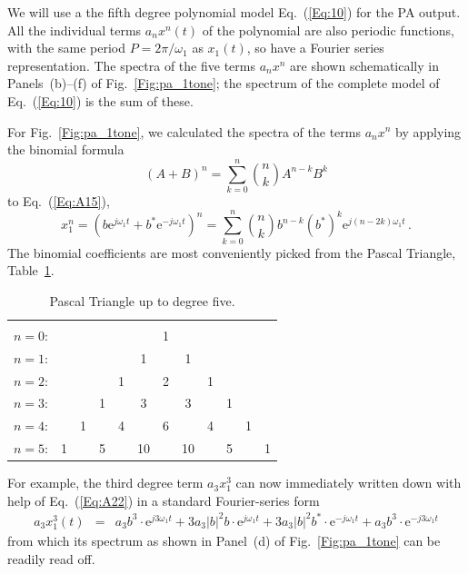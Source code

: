 \documentclass[11pt,oneside,a4paper]{scrartcl}
\newcommand{\EQ}[1]{\begin{equation}\label{Eq:#1}}
\newcommand{\EE}{\end{equation}}
\newcommand{\Eq}[1]{Eq.~(\ref{Eq:#1})}
\newcommand{\Fig}[1]{Fig.~\ref{Fig:#1}}
\newcommand{\Abs}[1]{\ensuremath{\left|#1\right|}}
\newcommand{\cc}[1]{\ensuremath{{#1}^*}}
\newcommand{ \Exp }[1] {\ensuremath {\mathrm e ^ {#1}}}
\begin{document}
We will use a the fifth degree polynomial model \Eq{10} for the PA output. All the individual terms $a_n x^n(t)$ of the polynomial are also periodic functions, with the same period $P = 2\pi/\omega_1$ as $x_1(t)$,  so have a Fourier series representation. The spectra of the five terms $a_n x^n$ are shown schematically in Panels~(b)--(f) of \Fig{pa_1tone}; the spectrum of the complete model of \Eq{10} is the sum of these.  

For \Fig{pa_1tone}, we calculated the spectra of the terms $a_n x^n$ by applying the binomial formula
\[
	(A+B)^n = \sum_{k=0}^n \binom{n}{k} A^{n-k}B^k 
\]
to \Eq{A15},
\EQ{A22}
	x_1^n
	=
	\left(b \Exp{j \omega_1 t} + \cc b \Exp{-j\omega_1 t}\right)^n
	= 
	\sum_{k=0}^n \binom{n}{k} b^{n-k}({\cc b})^k \Exp{j (n - 2k)\omega_1 t} \,.
\EE
The binomial coefficients are most conveniently picked from the Pascal Triangle, Table~\ref{pascal_triangle}. 
\begin{table}[t]
\caption{Pascal Triangle up to degree five.}
\begin{center}
\footnotesize
\begin{tabular}{rccccccccccc}\hline\\
$n=0$:&    &    &    &    &    &  1\\\noalign{\smallskip\smallskip}
$n=1$:&    &    &    &    &  1 &    &  1\\\noalign{\smallskip\smallskip}
$n=2$:&    &    &    &  1 &    &  2 &    &  1\\\noalign{\smallskip\smallskip}
$n=3$:&    &    &  1 &    &  3 &    &  3 &    &  1\\\noalign{\smallskip\smallskip}
$n=4$:&    &  1 &    &  4 &    &  6 &    &  4 &    &  1\\\noalign{\smallskip\smallskip}
$n=5$:&  1 &    &  5 &    & 10 &    & 10 &    &  5 &    &  1\\
\end{tabular}
\normalsize
\end{center}
\label{pascal_triangle}
\end{table}
%
For example, the third degree term $a_3x_1^3$ can now immediately written down with help of \Eq{A22} in a standard Fourier-series form
\begin{eqnarray}
	a_3x_1^3(t) &=&	a_3b^3 \cdot \Exp{j3\omega_1 t}
					+ 3a_3 {\Abs b}^2 {b} \cdot \Exp{j\omega_1 t}
					+ 3a_3 {\Abs b}^2 {\cc b} \cdot \Exp{-j\omega_1 t}
					+ a_3b^3\cdot \Exp{-j3\omega_1 t} 
					\label{Eq:A20}
\end{eqnarray}
from which its spectrum as shown in Panel~(d) of \Fig{pa_1tone} can be readily read off. 
\end{document}
